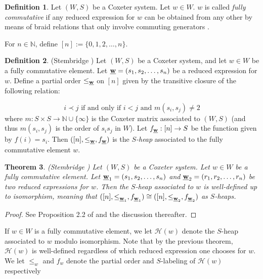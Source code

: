 \documentclass{amsart}
\theoremstyle{plain} %
\newtheorem{thm}{Theorem}[section]
\theoremstyle{definition}
\newtheorem{defi}[thm]{Definition}
\def\N{\mathbb{N}}
\def\H#1{\mathcal{H}(#1)}
\begin{document}
\begin{defi}
    Let $ (W,S)$ be a Coxeter system. Let $ w\in W$. $w$ is called \emph{fully commutative} if any reduced 
expression for $w$ can be obtained from any other by means of braid relations that only involve commuting generators \cite{stembridge1996fully}.
\end{defi}
For $ n\in \N$, define $ [n] := \{ 0,1,2, \dots , n \}$.

\begin{defi}{(Stembridge \cite{stembridge1996fully})}
    Let $ (W,S)$ be a Coxeter system, and let $ w\in W$ be a fully commutative element. Let $ \textbf{\underline{w}} = (s_{1} , s_{2} , \dots , s_{n})$ be a reduced expression for $w$. Define a partial order $ \leq_{\textbf{\underline{w}}}$ on $ [n]$ given by the transitive closure of the following relation:

    $$ i \prec j \textrm{ if and only if } i < j \textrm{ and } m(s_{i}, s_{j}) \neq 2$$ 
    where $ m: S \times S \rightarrow \N \cup \{ \infty \}$ is the Coxeter matrix associated to $ (W,S)$ (and thus $ m(s_{i}, s_{j})$ is the order of $ s_{i}s_{j}$ in $ W$). Let $ f_{\textbf{\underline{w}}} : [n] \rightarrow S$ be the function given by $ f(i) = s_{i}$. Then $ ([n] , \leq_{\textbf{\underline{w}}} , f_{\textbf{\underline{w}}})$ is the \emph{$S$-heap} associated to the fully commutative element $w$.
\end{defi}

\begin{thm}{(Stembridge \cite{stembridge1996fully})} \label{welldefthm}
    Let $ (W,S)$ be a Coxeter system. Let $ w \in W$ be a fully commutative element. Let $ \textbf{\underline{w}}_{1} = (s_{1}, s_{2} , \dots , s_{n})$ and $ \textbf{\underline{w}}_{2} = (r_{1}, r_{2}, \dots , r_{n})$ be two reduced expressions for $ w$. Then the $ S$-heap associated to $w$ is well-defined up to isomorphism, meaning that $ ([n] , \leq_{\textbf{\underline{w}}_{1}}, f_{\textbf{\underline{w}}_{1}}) \cong ([n], \leq_{\textbf{\underline{w}}_{2}}, f_{\textbf{\underline{w}}_{2}})$ as $S$-heaps. 
\end{thm}

\begin{proof}
    See Proposition 2.2 of \cite{stembridge1996fully} and the discussion thereafter.
\end{proof}
If $w\in W$ is a fully commutative element, we let $ \H{w}$ denote the $ S$-heap associated to $ w$ modulo isomorphism. Note that by the previous theorem, $\H{w}$ is well-defined regardless of which reduced expression one chooses for $ w$. We let $ \leq_{w}$ and $f_{w} $ denote the partial order and $S$-labeling of $ \H{w}$ respectively
\end{document}
